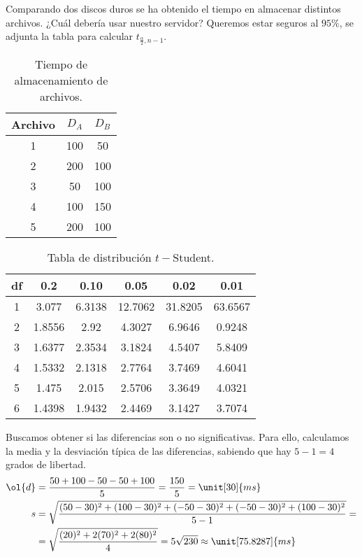 \documentclass[12pt]{article}
\begin{document}
    \begin{ejercicio}[2 puntos]
        Comparando dos discos duros se ha obtenido el tiempo en almacenar distintos archivos. ¿Cuál debería usar nuestro servidor? Queremos estar seguros al $95\%$, se adjunta la tabla para calcular $t_{\frac{\alpha}{2},n-1}$.
        \begin{table}[H]
        \centering
        \begin{tabular}{c|c|c}
            Archivo & $D_A$ & $D_B$ \\
            \hline
            1     & 100 & 50 \\
            2     & 200 & 100 \\
            3     & 50 & 100 \\
            4     & 100 & 150 \\
            5     & 200 & 100
        \end{tabular}
        \caption{Tiempo de almacenamiento de archivos.}
        \end{table}
        \begin{table}[H]
        \centering
        \begin{tabular}{c|c|c|c|c|c|}
            df & 0.2 & 0.10 & 0.05 & 0.02 & 0.01 \\
            \hline
            1 & 3.077 & 6.3138 & 12.7062 & 31.8205 & 63.6567 \\
            2 & 1.8556 & 2.92 & 4.3027 & 6.9646 & 0.9248 \\
            3 & 1.6377 & 2.3534 & 3.1824 & 4.5407 & 5.8409 \\
            4 & 1.5332 & 2.1318 & 2.7764 & 3.7469 & 4.6041 \\
            5 & 1.475 & 2.015 & 2.5706 & 3.3649 & 4.0321 \\
            6 & 1.4398 & 1.9432 & 2.4469 & 3.1427 & 3.7074
        \end{tabular}
        \caption{Tabla de distribución $t-$Student.}
        \end{table}

        Buscamos obtener si las diferencias son o no significativas. Para ello, calculamos la media y la desviación típica de las diferencias, sabiendo que hay $5-1=4$ grados de libertad.
        \begin{align*}
            \ol{d} &= \frac{50 + 100 - 50 - 50 + 100}{5} = \frac{150}{5} = \unit[30]{ms}\\
            s &= \sqrt{\frac{(50 - 30)^2 + (100 - 30)^2 + (-50 - 30)^2 + (-50 - 30)^2 + (100 - 30)^2}{5-1}}
            =\\&= \sqrt{\frac{(20)^2 + 2(70)^2 + 2(80)^2}{4}}
            = 5\sqrt{230} \approx \unit[75.8287]{ms}
        \end{align*}


\end{ejercicio}
\end{document}
